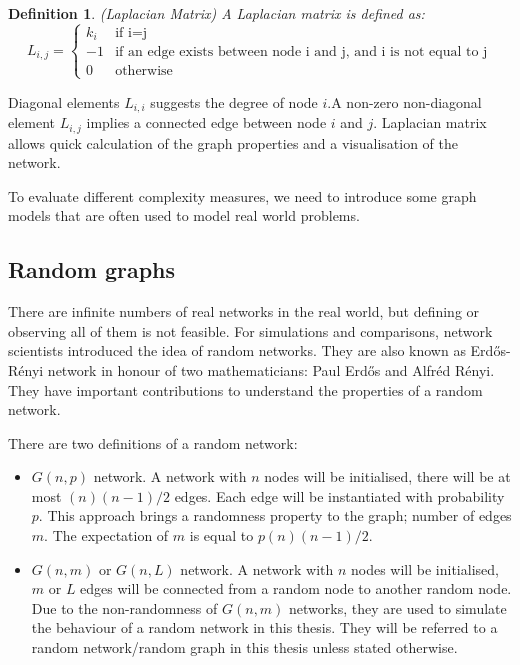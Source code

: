 \documentclass[12pt]{article}
\newtheorem{definition}{Definition}[section]
\begin{document}
\begin{definition}{(Laplacian Matrix)}
    A Laplacian matrix is defined as:
    \begin{equation}
        L_{i,j} = \begin{cases}
            k_{i}& \text{if i=j}\\
            -1 & \text{if an edge exists between node i and j, and i is not equal to j}\\
            0 & \text{otherwise}
        \end{cases}
    \end{equation}
\end{definition}
\par
Diagonal elements $L_{i,i}$ suggests the degree of node $i$.A non-zero non-diagonal element $L_{i,j}$ implies a connected edge between node $i$ and $j$. Laplacian matrix allows quick calculation of the graph properties and a visualisation of the network.

\par
To evaluate different complexity measures, we need to introduce some graph models that are often used to model real world problems.
\subsection{Random graphs}
There are infinite numbers of real networks in the real world, but defining or observing all of them is not feasible. For simulations and comparisons, network scientists introduced the idea of random networks. They are also known as Erd\H{o}s-R\'{e}nyi network in honour of two mathematicians: Paul Erd\H{o}s and Alfr\'{e}d R\'{e}nyi. They have important contributions to understand the properties of a random network\cite{renyi1959random}.\\
\par
There are two definitions of a random network:
\begin{itemize}
    \item $G(n,p)$ network. A network with $n$ nodes will be initialised, there will be at most $(n)(n-1)/2$ edges. Each edge will be instantiated with probability $p$. This approach brings a randomness property to the graph; number of edges $m$. The expectation of $m$ is equal to $p(n)(n-1)/2$.
    \item $G(n,m)$ or $G(n,L)$ network. A network with $n$ nodes will be initialised, $m$ or $L$ edges will be connected from a random node to another random node. Due to the non-randomness of $G(n,m)$ networks, they are used to simulate the behaviour of a random network in this thesis. They will be referred to a random network/random graph in this thesis unless stated otherwise.
\end{itemize}
\end{document}
